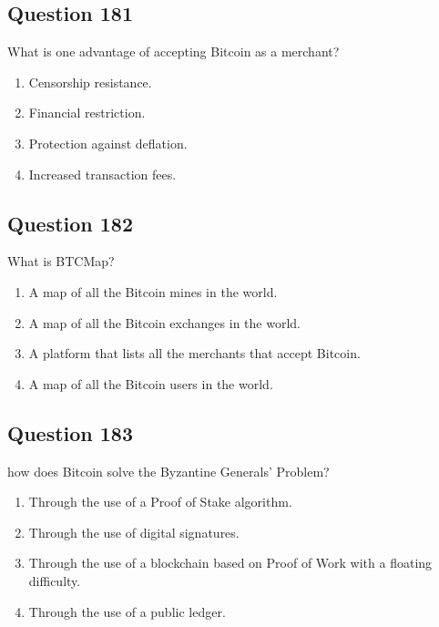 \documentclass[12pt,a4paper]{article}
\begin{document}
\bigskip


\subsection*{Question 181}
What is one advantage of accepting Bitcoin as a merchant?

\begin{enumerate}[label=\Alph*., leftmargin=*]
\item Censorship resistance.
\item Financial restriction.
\item Protection against deflation.
\item Increased transaction fees.
\end{enumerate}

\bigskip


\subsection*{Question 182}
What is BTCMap?

\begin{enumerate}[label=\Alph*., leftmargin=*]
\item A map of all the Bitcoin mines in the world.
\item A map of all the Bitcoin exchanges in the world.
\item A platform that lists all the merchants that accept Bitcoin.
\item A map of all the Bitcoin users in the world.
\end{enumerate}

\bigskip


\subsection*{Question 183}
how does Bitcoin solve the Byzantine Generals' Problem?

\begin{enumerate}[label=\Alph*., leftmargin=*]
\item Through the use of a Proof of Stake algorithm.
\item Through the use of digital signatures.
\item Through the use of a blockchain based on Proof of Work with a floating difficulty.
\item Through the use of a public ledger.
\end{enumerate}

\bigskip
\end{document}
